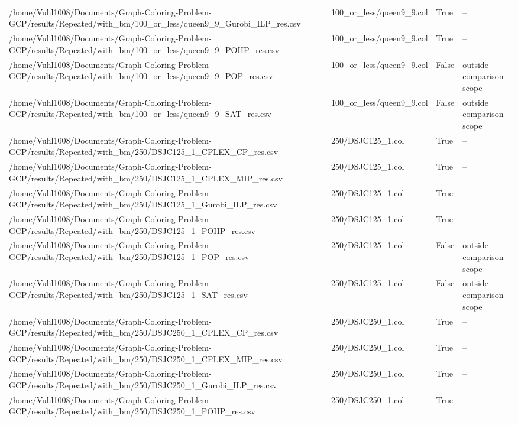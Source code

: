 \begin{table}[htbp]
\begin{tabular}{llll}
/home/Vuhl1008/Documents/Graph-Coloring-Problem-GCP/results/Repeated/with\_bm/100\_or\_less/queen9\_9\_Gurobi\_ILP\_res.csv & 100\_or\_less/queen9\_9.col & True & -- \\
/home/Vuhl1008/Documents/Graph-Coloring-Problem-GCP/results/Repeated/with\_bm/100\_or\_less/queen9\_9\_POHP\_res.csv & 100\_or\_less/queen9\_9.col & True & -- \\
/home/Vuhl1008/Documents/Graph-Coloring-Problem-GCP/results/Repeated/with\_bm/100\_or\_less/queen9\_9\_POP\_res.csv & 100\_or\_less/queen9\_9.col & False & outside comparison scope \\
/home/Vuhl1008/Documents/Graph-Coloring-Problem-GCP/results/Repeated/with\_bm/100\_or\_less/queen9\_9\_SAT\_res.csv & 100\_or\_less/queen9\_9.col & False & outside comparison scope \\
/home/Vuhl1008/Documents/Graph-Coloring-Problem-GCP/results/Repeated/with\_bm/250/DSJC125\_1\_CPLEX\_CP\_res.csv & 250/DSJC125\_1.col & True & -- \\
/home/Vuhl1008/Documents/Graph-Coloring-Problem-GCP/results/Repeated/with\_bm/250/DSJC125\_1\_CPLEX\_MIP\_res.csv & 250/DSJC125\_1.col & True & -- \\
/home/Vuhl1008/Documents/Graph-Coloring-Problem-GCP/results/Repeated/with\_bm/250/DSJC125\_1\_Gurobi\_ILP\_res.csv & 250/DSJC125\_1.col & True & -- \\
/home/Vuhl1008/Documents/Graph-Coloring-Problem-GCP/results/Repeated/with\_bm/250/DSJC125\_1\_POHP\_res.csv & 250/DSJC125\_1.col & True & -- \\
/home/Vuhl1008/Documents/Graph-Coloring-Problem-GCP/results/Repeated/with\_bm/250/DSJC125\_1\_POP\_res.csv & 250/DSJC125\_1.col & False & outside comparison scope \\
/home/Vuhl1008/Documents/Graph-Coloring-Problem-GCP/results/Repeated/with\_bm/250/DSJC125\_1\_SAT\_res.csv & 250/DSJC125\_1.col & False & outside comparison scope \\
/home/Vuhl1008/Documents/Graph-Coloring-Problem-GCP/results/Repeated/with\_bm/250/DSJC250\_1\_CPLEX\_CP\_res.csv & 250/DSJC250\_1.col & True & -- \\
/home/Vuhl1008/Documents/Graph-Coloring-Problem-GCP/results/Repeated/with\_bm/250/DSJC250\_1\_CPLEX\_MIP\_res.csv & 250/DSJC250\_1.col & True & -- \\
/home/Vuhl1008/Documents/Graph-Coloring-Problem-GCP/results/Repeated/with\_bm/250/DSJC250\_1\_Gurobi\_ILP\_res.csv & 250/DSJC250\_1.col & True & -- \\
/home/Vuhl1008/Documents/Graph-Coloring-Problem-GCP/results/Repeated/with\_bm/250/DSJC250\_1\_POHP\_res.csv & 250/DSJC250\_1.col & True & -- \\

\end{tabular}
\end{table}
